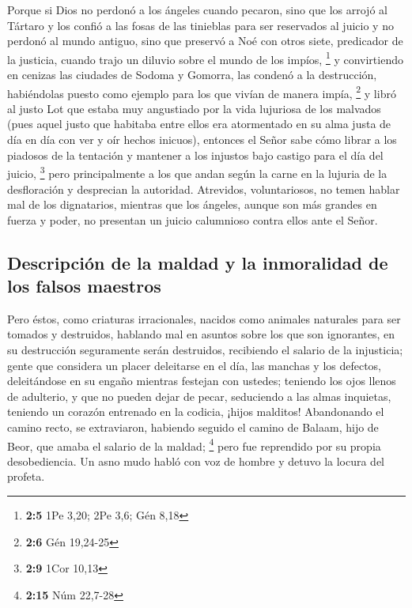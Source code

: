 \begin{paracol}{2}
 Porque si Dios no perdonó a los ángeles cuando pecaron,
sino que los arrojó al Tártaro y los confió a las fosas de las tinieblas
para ser reservados al juicio  y no perdonó al mundo
antiguo, sino que preservó a Noé con otros siete, predicador de la
justicia, cuando trajo un diluvio sobre el mundo de los impíos,
\footnote{\textbf{2:5} 1Pe 3,20; 2Pe 3,6; Gén 8,18}  y
convirtiendo en cenizas las ciudades de Sodoma y Gomorra, las condenó a
la destrucción, habiéndolas puesto como ejemplo para los que vivían de
manera impía, \footnote{\textbf{2:6} Gén 19,24-25}  y
libró al justo Lot que estaba muy angustiado por la vida lujuriosa de
los malvados  (pues aquel justo que habitaba entre ellos
era atormentado en su alma justa de día en día con ver y oír hechos
inicuos),  entonces el Señor sabe cómo librar a los
piadosos de la tentación y mantener a los injustos bajo castigo para el
día del juicio, \footnote{\textbf{2:9} 1Cor 10,13}  pero
principalmente a los que andan según la carne en la lujuria de la
desfloración y desprecian la autoridad. Atrevidos, voluntariosos, no
temen hablar mal de los dignatarios,  mientras que los
ángeles, aunque son más grandes en fuerza y poder, no presentan un
juicio calumnioso contra ellos ante el Señor.

\hypertarget{descripciuxf3n-de-la-maldad-y-la-inmoralidad-de-los-falsos-maestros}{%
\subsection{Descripción de la maldad y la inmoralidad de los falsos
maestros}\label{descripciuxf3n-de-la-maldad-y-la-inmoralidad-de-los-falsos-maestros}}

 Pero éstos, como criaturas irracionales, nacidos como
animales naturales para ser tomados y destruidos, hablando mal en
asuntos sobre los que son ignorantes, en su destrucción seguramente
serán destruidos,  recibiendo el salario de la
injusticia; gente que considera un placer deleitarse en el día, las
manchas y los defectos, deleitándose en su engaño mientras festejan con
ustedes;  teniendo los ojos llenos de adulterio, y que no
pueden dejar de pecar, seduciendo a las almas inquietas, teniendo un
corazón entrenado en la codicia, ¡hijos malditos! 
Abandonando el camino recto, se extraviaron, habiendo seguido el camino
de Balaam, hijo de Beor, que amaba el salario de la maldad; \footnote{\textbf{2:15}
  Núm 22,7-28}  pero fue reprendido por su propia
desobediencia. Un asno mudo habló con voz de hombre y detuvo la locura
del profeta.


\end{paracol}
